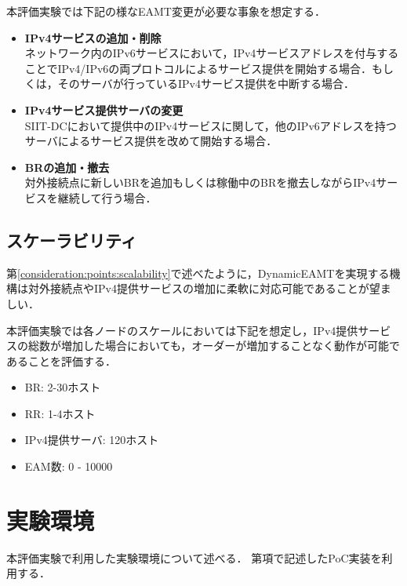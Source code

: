 本評価実験では下記の様なEAMT変更が必要な事象を想定する．

\begin{itemize}
    \item \textbf{IPv4サービスの追加・削除} \\
    ネットワーク内のIPv6サービスにおいて，IPv4サービスアドレスを付与することでIPv4/IPv6の両プロトコルによるサービス提供を開始する場合．もしくは，そのサーバが行っているIPv4サービス提供を中断する場合．
    \item \textbf{IPv4サービス提供サーバの変更} \\
    SIIT-DCにおいて提供中のIPv4サービスに関して，他のIPv6アドレスを持つサーバによるサービス提供を改めて開始する場合．
    \item \textbf{BRの追加・撤去} \\ 
    対外接続点に新しいBRを追加もしくは稼働中のBRを撤去しながらIPv4サービスを継続して行う場合．
\end{itemize}


\subsection{スケーラビリティ}
第\ref{consideration:points:scalability}で述べたように，DynamicEAMTを実現する機構は対外接続点やIPv4提供サービスの増加に柔軟に対応可能であることが望ましい．

本評価実験では各ノードのスケールにおいては下記を想定し，IPv4提供サービスの総数が増加した場合においても，オーダーが増加することなく動作が可能であることを評価する．

\begin{itemize}
    \item BR: 2-30ホスト 
    \item RR: 1-4ホスト 
    \item IPv4提供サーバ: 120ホスト
    \item EAM数: 0 - 10000
\end{itemize}


\section{実験環境}
本評価実験で利用した実験環境について述べる．
第\label{implementation:poc}項で記述したPoC実装を利用する．

